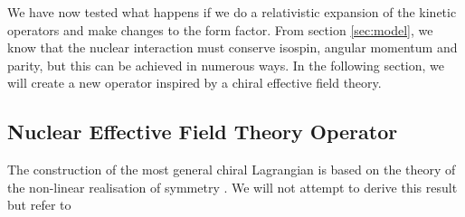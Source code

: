 We have now tested what happens if we do a relativistic expansion of the kinetic operators and make changes to the form factor. From section \ref{sec:model}, we know that the nuclear interaction must conserve isospin, angular momentum and parity, but this can be achieved in numerous ways. In the following section, we will create a new operator inspired by a chiral effective field theory.
\subsection{Nuclear Effective Field Theory Operator}\label{sec:EFT}
The construction of the most general chiral Lagrangian is based on the theory of the non-linear realisation of symmetry \cite{EFTLagrangian}. We will not attempt to derive this result but refer to \cite{EFTLagrangian, ChiralSymmetry, Weinberg2, ZeeQFT}



